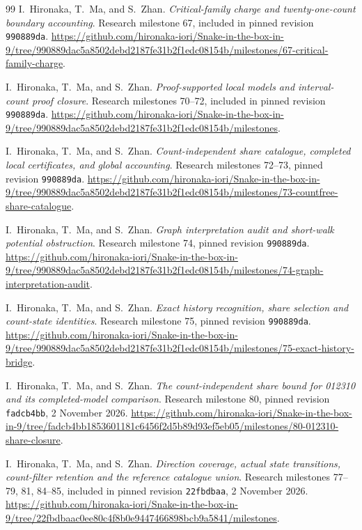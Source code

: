 \documentclass[11pt,a4paper]{article}
\theoremstyle{definition}
\theoremstyle{remark}
\begin{document}
\begin{thebibliography}{99}
I.~Hironaka, T.~Ma, and S.~Zhan. \emph{Critical-family charge and twenty-one-count boundary accounting}. Research milestone 67, included in pinned revision \texttt{990889da}.
\url{https://github.com/hironaka-iori/Snake-in-the-box-in-9/tree/990889dac5a8502debd2187fe31b2f1edc08154b/milestones/67-critical-family-charge}.

I.~Hironaka, T.~Ma, and S.~Zhan. \emph{Proof-supported local models and interval-count proof closure}. Research milestones 70--72, included in pinned revision \texttt{990889da}.
\url{https://github.com/hironaka-iori/Snake-in-the-box-in-9/tree/990889dac5a8502debd2187fe31b2f1edc08154b/milestones}.

I.~Hironaka, T.~Ma, and S.~Zhan. \emph{Count-independent share catalogue, completed local certificates, and global accounting}. Research milestones 72--73, pinned revision \texttt{990889da}.
\url{https://github.com/hironaka-iori/Snake-in-the-box-in-9/tree/990889dac5a8502debd2187fe31b2f1edc08154b/milestones/73-countfree-share-catalogue}.

I.~Hironaka, T.~Ma, and S.~Zhan. \emph{Graph interpretation audit and short-walk potential obstruction}. Research milestone 74, pinned revision \texttt{990889da}.
\url{https://github.com/hironaka-iori/Snake-in-the-box-in-9/tree/990889dac5a8502debd2187fe31b2f1edc08154b/milestones/74-graph-interpretation-audit}.

I.~Hironaka, T.~Ma, and S.~Zhan. \emph{Exact history recognition, share selection and count-state identities}. Research milestone 75, pinned revision \texttt{990889da}.
\url{https://github.com/hironaka-iori/Snake-in-the-box-in-9/tree/990889dac5a8502debd2187fe31b2f1edc08154b/milestones/75-exact-history-bridge}.

I.~Hironaka, T.~Ma, and S.~Zhan. \emph{The count-independent share bound for 012310 and its completed-model comparison}. Research milestone 80, pinned revision \texttt{fadcb4bb}, 2 November 2026.
\url{https://github.com/hironaka-iori/Snake-in-the-box-in-9/tree/fadcb4bb1853601181c6456f2d5b89d93ef5eb05/milestones/80-012310-share-closure}.

I.~Hironaka, T.~Ma, and S.~Zhan. \emph{Direction coverage, actual state transitions, count-filter retention and the reference catalogue union}. Research milestones 77--79, 81, 84--85, included in pinned revision \texttt{22fbdbaa}, 2 November 2026.
\url{https://github.com/hironaka-iori/Snake-in-the-box-in-9/tree/22fbdbaac0ee80c4f8b0e9447466898bcb9a5841/milestones}.


\end{thebibliography}
\end{document}
